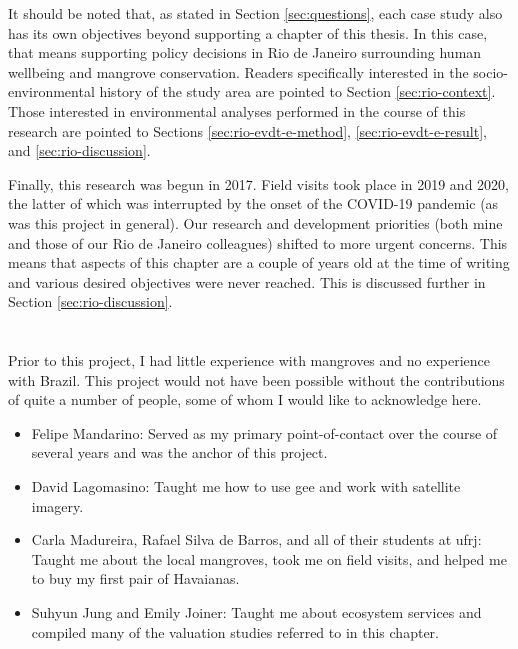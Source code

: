 It should be noted that, as stated in Section \ref{sec:questions}, each case study also has its own objectives beyond supporting a chapter of this thesis. In this case, that means supporting policy decisions in Rio de Janeiro surrounding human wellbeing and mangrove conservation. Readers specifically interested in the socio-environmental history of the study area are pointed to Section \ref{sec:rio-context}. Those interested in environmental analyses performed in the course of this research are pointed to Sections \ref{sec:rio-evdt-e-method}, \ref{sec:rio-evdt-e-result}, and \ref{sec:rio-discussion}.

Finally, this research was begun in 2017. Field visits took place in 2019 and 2020, the latter of which was interrupted by the onset of the COVID-19 pandemic (as was this project in general). Our research and development priorities (both mine and those of our Rio de Janeiro colleagues) shifted to more urgent concerns. This means that aspects of this chapter are a couple of years old at the time of writing and various desired objectives were never reached. This is discussed further in Section \ref{sec:rio-discussion}.

\section{}

Prior to this project, I had little experience with mangroves and no experience with Brazil. This project would not have been possible without the contributions of quite a number of people, some of whom I would like to acknowledge here.

\begin{itemize}[itemsep=0pt,parsep=0pt]
	\item{Felipe Mandarino: Served as my primary point-of-contact over the course of several years and was the anchor of this project.}
	\item{David Lagomasino: Taught me how to use \ac{gee} and work with satellite imagery.}
	\item{Carla Madureira, Rafael Silva de Barros, and all of their students at \ac{ufrj}: Taught me about the local mangroves, took me on field visits, and helped me to buy my first pair of Havaianas.}
	\item{Suhyun Jung and Emily Joiner: Taught me about ecosystem services and compiled many of the valuation studies referred to in this chapter.}
\end{itemize}


